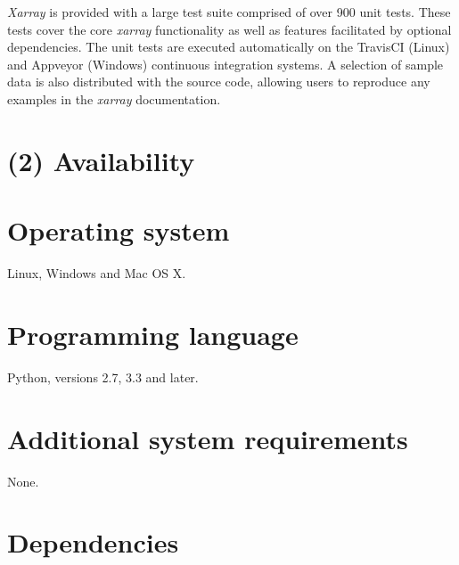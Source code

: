 \documentclass{jors}
\begin{document}
\textit{Xarray} is provided with a large test suite comprised of over 900 unit tests.
These tests cover the core \textit{xarray} functionality as well as features facilitated by optional dependencies.
The unit tests are executed automatically on the TravisCI (Linux) \citep{TravisCI} and Appveyor (Windows) \citep{Appveyor} continuous integration systems.
A selection of sample data is also distributed with the source code, allowing users to reproduce any examples in the \textit{xarray} documentation.

\section*{(2) Availability}
\vspace{0.5cm}
\section*{Operating system}

Linux, Windows and Mac OS X.

\section*{Programming language}

Python, versions 2.7, 3.3 and later.

\section*{Additional system requirements}

None.

\section*{Dependencies}
\end{document}
